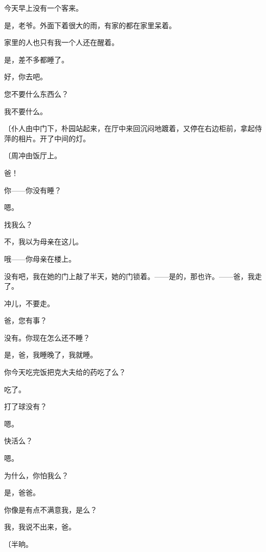 今天早上没有一个客来。

是，老爷。外面下着很大的雨，有家的都在家里呆着。

家里的人也只有我一个人还在醒着。

是，差不多都睡了。

好，你去吧。

您不要什么东西么？

我不要什么。

{\fangsong〔仆人由中门下，朴园站起来，在厅中来回沉闷地踱着，又停在右边柜前，拿起侍萍的相片。开了中间的灯。}

{\fangsong〔周冲由饭厅上。}

爸！

你——你没有睡？

嗯。

找我么？

不，我以为母亲在这儿。

哦——你母亲在楼上。

没有吧，我在她的门上敲了半天，她的门锁着。——是的，那也许。——爸，我走了。

冲儿，不要走。

爸，您有事？

没有。你现在怎么还不睡？

是，爸，我睡晚了，我就睡。

你今天吃完饭把克大夫给的药吃了么？

吃了。

打了球没有？

嗯。

快活么？

嗯。

为什么，你怕我么？

是，爸爸。

你像是有点不满意我，是么？

我，我说不出来，爸。

{\fangsong〔半晌。}

